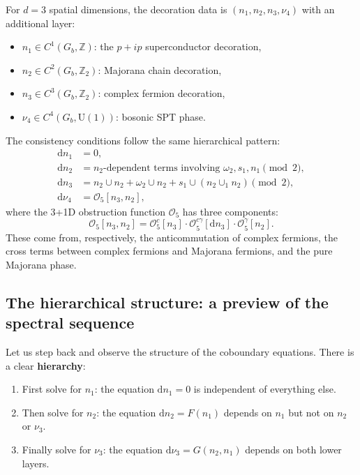 \documentclass{SciPost}
\theoremstyle{definition}
\newcommand{\Z}{\mathbb{Z}}
\newcommand{\Zt}{\mathbb{Z}_2}
\newcommand{\U}{\mathrm{U}}
\newcommand{\Gb}{G_b}
\newcommand{\dd}{\mathrm{d}}
\begin{document}
For $d=3$ spatial dimensions, the decoration data is $(n_1, n_2, n_3, \nu_4)$ with an additional layer:
\begin{itemize}
    \item $n_1 \in C^1(\Gb, \Z)$: the $p+ip$ superconductor decoration,
    \item $n_2 \in C^2(\Gb, \Zt)$: Majorana chain decoration,
    \item $n_3 \in C^3(\Gb, \Zt)$: complex fermion decoration,
    \item $\nu_4 \in C^4(\Gb, \U(1))$: bosonic SPT phase.
\end{itemize}
The consistency conditions follow the same hierarchical pattern:
\begin{align}
\dd n_1 &= 0, \label{eq:3d-layer1} \\
\dd n_2 &= n_2 \text{-dependent terms involving } \omega_2, s_1, n_1 \pmod{2}, \label{eq:3d-layer2} \\
\dd n_3 &= n_2 \cup n_2 + \omega_2 \cup n_2 + s_1 \cup (n_2 \cup_1 n_2) \pmod{2}, \label{eq:3d-layer3} \\
\dd \nu_4 &= \mathcal{O}_5[n_3, n_2], \label{eq:3d-layer4}
\end{align}
where the 3+1D obstruction function $\mathcal{O}_5$ has three components:
\begin{equation}
\mathcal{O}_5[n_3, n_2] = \mathcal{O}_5^c[n_3] \cdot \mathcal{O}_5^{c\gamma}[\dd n_3] \cdot \mathcal{O}_5^\gamma[n_2].
\end{equation}
These come from, respectively, the anticommutation of complex fermions, the cross terms between complex fermions and Majorana fermions, and the pure Majorana phase.

\subsection{The hierarchical structure: a preview of the spectral sequence}
\label{subsec:hierarchical-preview}

Let us step back and observe the structure of the coboundary equations.
There is a clear \textbf{hierarchy}:
\begin{enumerate}
    \item First solve for $n_1$: the equation $\dd n_1 = 0$ is independent of everything else.
    \item Then solve for $n_2$: the equation $\dd n_2 = F(n_1)$ depends on $n_1$ but not on $n_2$ or $\nu_3$.
    \item Finally solve for $\nu_3$: the equation $\dd \nu_3 = G(n_2, n_1)$ depends on both lower layers.
\end{enumerate}
\end{document}
